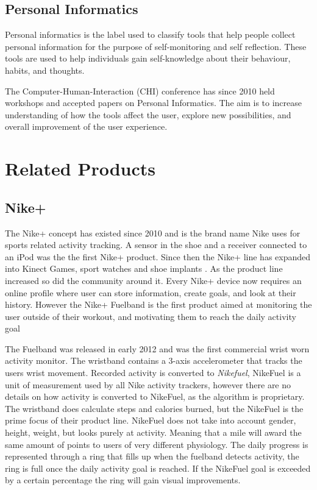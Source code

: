 \subsection{Personal Informatics}
Personal informatics is the label used to classify tools that help people collect personal information for the purpose of self-monitoring and self reflection. These tools are used to help individuals gain self-knowledge about their behaviour, habits, and thoughts\cite{personalInformatics}.

The Computer-Human-Interaction (CHI) conference has since 2010 \cite{chi2010} held workshops and accepted papers on Personal Informatics. The aim is to increase understanding of how the tools affect the user, explore  new possibilities, and overall improvement of the user experience.
	
\section{Related Products}

\subsection{Nike+}
The Nike+ concept has existed since 2010 and is the brand name Nike uses for sports related activity tracking. A sensor in the shoe and a receiver connected to an iPod was the the first Nike+ product. Since then the Nike+ line has expanded into Kinect Games, sport watches and shoe implants \cite{nikeProducts}. As the product line increased so did the community around it. Every Nike+ device now requires an online profile where user can store information, create goals, and look at their history. However the Nike+ Fuelband \cite{fuelBand} is the first product aimed at monitoring the user outside of their workout, and motivating them to reach the daily activity goal

The Fuelband\cite{fuelBand} was released in early 2012 and was the first commercial wrist worn activity monitor. The wristband contains a 3-axis accelerometer that tracks the users wrist movement. Recorded activity is converted to \emph{Nikefuel}, NikeFuel\cite{nikefuel} is a unit of measurement used by all Nike activity trackers, however there are no details on how activity is converted to NikeFuel, as the algorithm is proprietary. The wristband does calculate steps and calories burned, but the NikeFuel is the prime focus of their product line. NikeFuel does not take into account gender, height, weight, but looks purely at activity. Meaning that a mile will award the same amount of points to users of very different physiology. The daily progress is represented through a ring that fills up when the fuelband detects activity, the ring is full once the daily activity goal is reached. If the NikeFuel goal is exceeded by a certain percentage the ring will gain visual improvements. 

